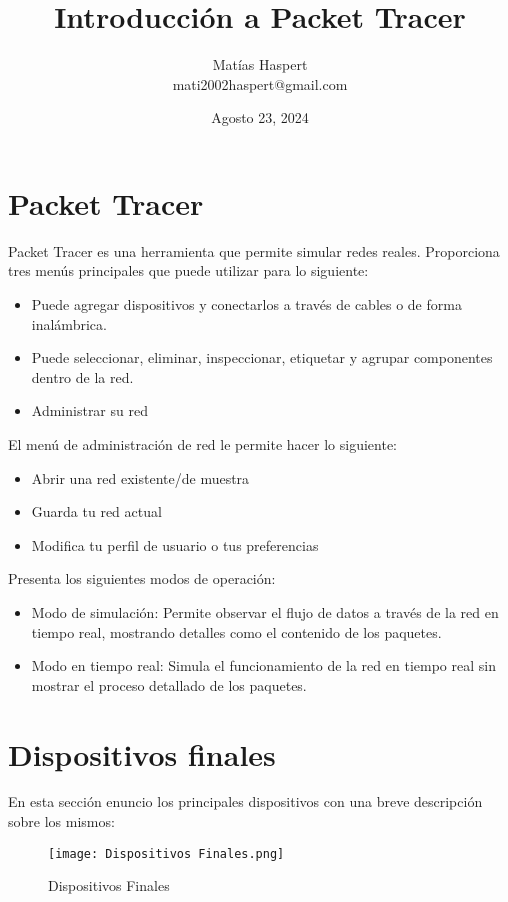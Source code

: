 \documentclass[12pt, a4paper]{article}
\begin{document}
\title{Introducción a Packet Tracer}
\author{Matías Haspert\\mati2002haspert@gmail.com}
\date{Agosto 23, 2024}
\maketitle

\section{Packet Tracer}
Packet Tracer es una herramienta que permite simular redes reales. Proporciona tres menús principales que puede utilizar para lo siguiente:
\begin{itemize}
    \item Puede agregar dispositivos y conectarlos a través de cables o de forma inalámbrica.
    \item Puede seleccionar, eliminar, inspeccionar, etiquetar y agrupar componentes dentro de la red.
    \item Administrar su red
\end{itemize}

El menú de administración de red le permite hacer lo siguiente:
\begin{itemize}
    \item Abrir una red existente/de muestra
    \item Guarda tu red actual
    \item Modifica tu perfil de usuario o tus preferencias
\end{itemize}

Presenta los siguientes modos de operación:
\begin{itemize}
    \item Modo de simulación: Permite observar el flujo de datos a través de la red en tiempo real, mostrando detalles como el contenido de los paquetes.
    \item Modo en tiempo real: Simula el funcionamiento de la red en tiempo real sin mostrar el proceso detallado de los paquetes.
\end{itemize}

\section{Dispositivos finales}
En esta sección enuncio los principales dispositivos con una breve descripción sobre los mismos:

\begin{figure}[H]
    \centering
    \texttt{[image: Dispositivos Finales.png]}
    \caption{Dispositivos Finales}
    \label{fig:enter-label}
\end{figure}
\end{document}
